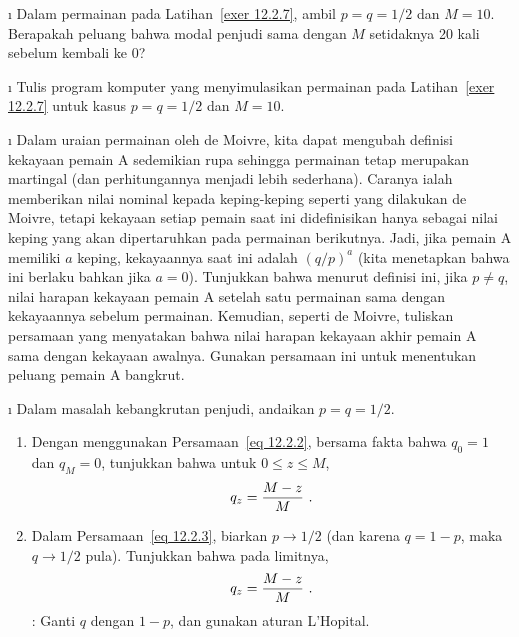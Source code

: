 \begin{LJSItem}
\i\label{exer 12.2.8} Dalam permainan pada Latihan~\ref{exer 12.2.7}, ambil
$p = q = 1/2$ dan $M = 10$. Berapakah peluang bahwa modal penjudi sama dengan
$M$ setidaknya 20 kali sebelum kembali ke 0?

\i\label{exer 12.2.9} Tulis program komputer yang menyimulasikan permainan pada
Latihan~\ref{exer 12.2.7} untuk kasus $p = q = 1/2$ dan $M = 10$.  

\i\label{exer 12.2.10} Dalam uraian permainan oleh de Moivre, kita dapat
mengubah definisi kekayaan pemain A sedemikian rupa sehingga permainan tetap
merupakan martingal (dan perhitungannya menjadi lebih sederhana). Caranya ialah
memberikan nilai nominal kepada keping-keping seperti yang dilakukan de Moivre,
tetapi kekayaan setiap pemain saat ini didefinisikan hanya sebagai nilai keping
yang akan dipertaruhkan pada permainan berikutnya. Jadi, jika pemain A memiliki
$a$ keping, kekayaannya saat ini adalah $(q/p)^a$ (kita menetapkan bahwa ini
berlaku bahkan jika $a = 0$). Tunjukkan bahwa menurut definisi ini, jika
$p \ne q$, nilai harapan kekayaan pemain A setelah satu permainan sama dengan
kekayaannya sebelum permainan. Kemudian, seperti de Moivre, tuliskan persamaan
yang menyatakan bahwa nilai harapan kekayaan akhir pemain A sama dengan
kekayaan awalnya. Gunakan persamaan ini untuk menentukan peluang pemain A
bangkrut.

\i\label{exer 12.2.11} Dalam masalah kebangkrutan penjudi, andaikan
$p = q = 1/2$.
\begin{enumerate}
\item Dengan menggunakan Persamaan~\ref{eq 12.2.2}, bersama fakta bahwa
$q_0 = 1$ dan $q_M = 0$, tunjukkan bahwa untuk $0 \le z \le M$,
$$q_z = {{M - z}\over M}\ .$$
\item Dalam Persamaan~\ref{eq 12.2.3}, biarkan $p \rightarrow 1/2$ (dan karena
$q = 1 - p$, maka $q \rightarrow 1/2$ pula). Tunjukkan bahwa pada limitnya,
$$q_z = {{M - z}\over M}\ .$$  : Ganti $q$ dengan $1-p$, dan
gunakan aturan L'Hopital.
\end{enumerate}


\end{LJSItem}
